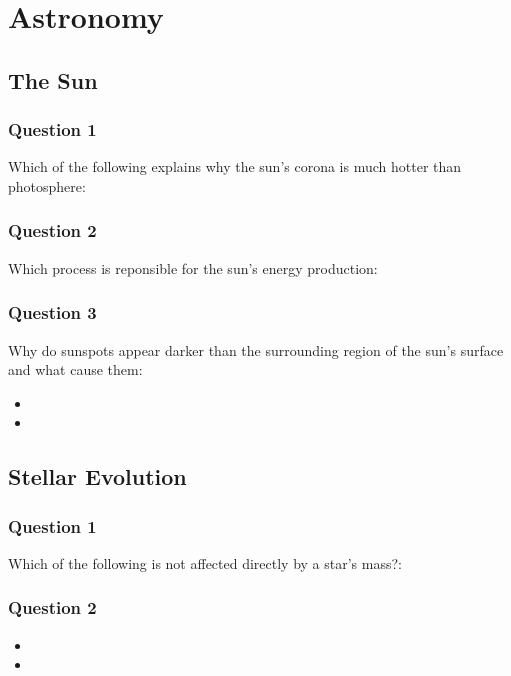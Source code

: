 \chapter{Astronomy}
\section{The Sun}
\subsection{Question 1}
    Which of the following explains why the sun's corona is much hotter than photosphere:\\

\subsection{Question 2}
Which process is reponsible for the sun's energy production:\\

\subsection{Question 3}
Why do sunspots appear darker than the surrounding region of the sun's surface and what cause them:
\begin{itemize}
    \item {}
    \item {}
\end{itemize}

\section{Stellar Evolution}
\subsection{Question 1}
Which of the following is not affected directly by a star's mass?:\\

\subsection{Question 2}
\begin{itemize}
    \item {}
    \item {}
\end{itemize}

